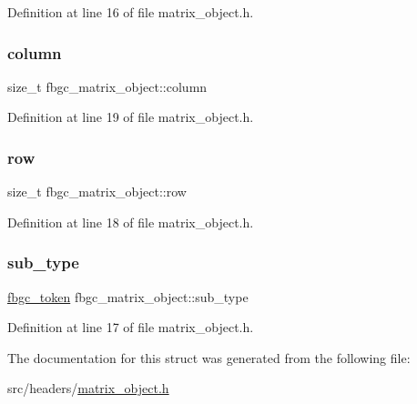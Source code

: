Definition at line 16 of file matrix\+\_\+object.\+h.

\mbox{\label{structfbgc__matrix__object_a7c2a97b51968eebb093c6f658edc7f7d}} 
\subsubsection{\texorpdfstring{column}{column}}
{\footnotesize\ttfamily size\+\_\+t fbgc\+\_\+matrix\+\_\+object\+::column}



Definition at line 19 of file matrix\+\_\+object.\+h.

\mbox{\label{structfbgc__matrix__object_a398dc517a5a86968ca33b1addd2702c8}} 
\subsubsection{\texorpdfstring{row}{row}}
{\footnotesize\ttfamily size\+\_\+t fbgc\+\_\+matrix\+\_\+object\+::row}



Definition at line 18 of file matrix\+\_\+object.\+h.

\mbox{\label{structfbgc__matrix__object_acf6def65e43e5fa765a4479365a4d653}} 
\subsubsection{\texorpdfstring{sub\+\_\+type}{sub\_type}}
{\footnotesize\ttfamily \hyperlink{tokens_8h_a9d21ebbf42e602eb0cf502c867d20a7e}{fbgc\+\_\+token} fbgc\+\_\+matrix\+\_\+object\+::sub\+\_\+type}



Definition at line 17 of file matrix\+\_\+object.\+h.



The documentation for this struct was generated from the following file\+:\begin{DoxyCompactItemize}
\item 
src/headers/\hyperlink{matrix__object_8h}{matrix\+\_\+object.\+h}\end{DoxyCompactItemize}
